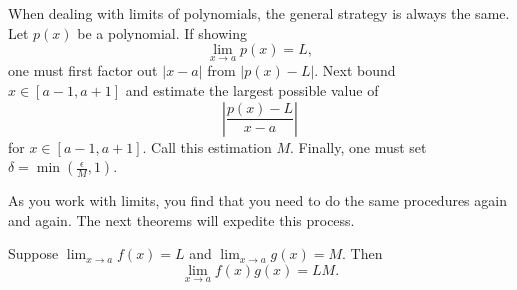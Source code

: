 When dealing with limits of polynomials, the general strategy is
always the same. Let $p(x)$ be a polynomial. If showing
\[
\lim_{x\to a} p(x) = L,
\]
one must first factor out $|x-a|$ from $|p(x) - L|$. Next bound $x\in
[a-1,a+1]$ and estimate the largest possible value of
\[
\left|\frac{p(x) -L}{x-a}\right|
\]
for $x\in[a-1,a+1]$. Call this estimation $M$. Finally, one must set
$\delta = \min\left(\frac{\epsilon}{M}, 1\right)$.

As you work with limits, you find that you need to do the same
procedures again and again. The next theorems will expedite this
process.
\begin{theorem} 
Suppose $\lim_{x\to a} f(x)=L$ and $\lim_{x\to a}g(x)=M$. Then
\[
\lim_{x\to a} f(x)g(x) = LM.
\]
\end{theorem}

